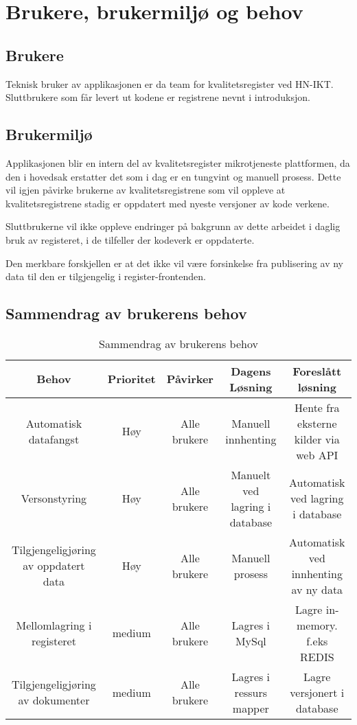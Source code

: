 \section{Brukere, brukermiljø og behov}

\subsection{Brukere}  

Teknisk bruker av applikasjonen er da team for kvalitetsregister ved HN-IKT. Sluttbrukere som får levert ut kodene er registrene nevnt i introduksjon.\\ 

\subsection{Brukermiljø}  

Applikasjonen blir en intern del av kvalitetsregister mikrotjeneste plattformen, da den i hovedsak erstatter det som i dag er en tungvint og manuell prosess. Dette vil igjen påvirke brukerne av kvalitetsregistrene som vil oppleve at kvalitetsregistrene stadig er oppdatert med nyeste versjoner av kode verkene.

Sluttbrukerne vil ikke oppleve endringer på bakgrunn av dette arbeidet i daglig bruk av registeret, i de tilfeller der kodeverk er oppdaterte.

Den merkbare forskjellen er at det ikke vil være forsinkelse fra publisering av ny data til den er tilgjengelig i register-frontenden.
 
\begin{landscape}
\subsection{Sammendrag av brukerens behov} 
\begin{table}[H]
\centering
\begin{tabular}{|c|c|c|c|c|} 
\hline
Behov & Prioritet & Påvirker & Dagens Løsning & Foreslått løsning\\
\hline\hline
Automatisk datafangst & Høy & Alle brukere & Manuell innhenting & Hente fra eksterne kilder via web API\\
\hline
Versonstyring & Høy & Alle brukere & Manuelt ved lagring i database & Automatisk ved lagring i database\\
\hline
Tilgjengeligjøring av oppdatert data & Høy & Alle brukere & Manuell prosess & Automatisk ved innhenting av ny data\\
\hline
Mellomlagring i registeret & medium & Alle brukere & Lagres i MySql & Lagre in-memory. f.eks REDIS\\
\hline
Tilgjengeligjøring av dokumenter & medium & Alle brukere & Lagres i ressurs mapper & Lagre versjonert i database\\
\hline
\end{tabular}
\caption{Sammendrag av brukerens behov}
\label{table}
\end{table}
\end{landscape}
